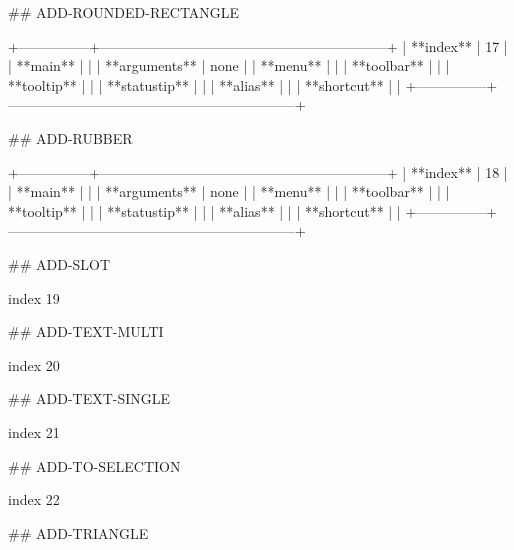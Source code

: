 ## ADD-ROUNDED-RECTANGLE

+---------------+--------------------------------------------------------------+
| **index**     | 17                                                           |
| **main**      |                                                              |
| **arguments** | none                                                         |
| **menu**      |                                                              |
| **toolbar**   |                                                              |
| **tooltip**   |                                                              |
| **statustip** |                                                              |
| **alias**     |                                                              |
| **shortcut**  |                                                              |
+---------------+--------------------------------------------------------------+

## ADD-RUBBER

+---------------+--------------------------------------------------------------+
| **index**     | 18                                                           |
| **main**      |                                                              |
| **arguments** | none                                                         |
| **menu**      |                                                              |
| **toolbar**   |                                                              |
| **tooltip**   |                                                              |
| **statustip** |                                                              |
| **alias**     |                                                              |
| **shortcut**  |                                                              |
+---------------+--------------------------------------------------------------+


## ADD-SLOT

index 19



## ADD-TEXT-MULTI

index 20



## ADD-TEXT-SINGLE

index 21



## ADD-TO-SELECTION

index 22



## ADD-TRIANGLE

